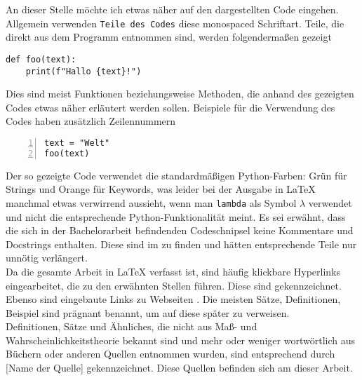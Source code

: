 An dieser Stelle möchte ich etwas näher auf den dargestellten Code eingehen. Allgemein verwenden \lstinline|Teile des Codes| diese monospaced Schriftart. Teile, die direkt aus dem Programm entnommen sind, werden folgendermaßen gezeigt
\begin{lstlisting}
def foo(text):
    print(f"Hallo {text}!")
\end{lstlisting}
Dies sind meist Funktionen beziehungsweise Methoden, die anhand des gezeigten Codes etwas näher erläutert werden sollen. Beispiele für die Verwendung des Codes haben zusätzlich Zeilennummern
\begin{lstlisting}[numbers=left, numberstyle=\tiny\color{codegray}]
text = "Welt"
foo(text)
\end{lstlisting}
Der so gezeigte Code verwendet die standardmäßigen Python-Farben: {\color{codegreen}Grün} für Strings und {\color{codeorange}Orange} für Keywords, was leider bei der Ausgabe in \LaTeX{} manchmal etwas verwirrend aussieht, wenn man \lstinline|lambda| als Symbol $\lambda$ verwendet und nicht die entsprechende Python-Funktionalität meint. Es sei erwähnt, dass die sich in der Bachelorarbeit befindenden Codeschnipsel keine Kommentare und Docstrings enthalten. Diese sind im \hyperlink{Sec:Anhang}{} zu finden und hätten entsprechende Teile nur unnötig verlängert.\\

Da die gesamte Arbeit in \LaTeX{} verfasst ist, sind häufig klickbare Hyperlinks eingearbeitet, die zu den erwähnten Stellen führen. Diese sind  gekennzeichnet. Ebenso sind eingebaute Links zu Webseiten . Die meisten Sätze, Definitionen, Beispiel sind prägnant benannt, um auf diese später zu verweisen.\\

Definitionen, Sätze und Ähnliches, die nicht aus Maß- und Wahrscheinlichkeitstheorie bekannt sind und mehr oder weniger wortwörtlich aus Büchern oder anderen Quellen entnommen wurden, sind entsprechend durch [Name der Quelle] gekennzeichnet. Diese Quellen befinden sich am \hyperlink{Sec:Bib}{} dieser Arbeit.